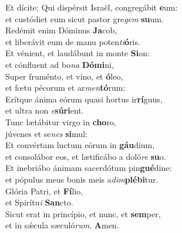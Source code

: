 \evenverse Et dícite: Qui dispérsit Israël, congregábit \textbf{e}um:~\*\\
\evenverse et custódiet eum sicut pastor gre\textit{gem} \textbf{su}um.\\
\oddverse Redémit enim Dóminus \textbf{Ja}cob,~\*\\
\oddverse et liberávit eum de manu poten\textit{ti}\textbf{ó}ris.\\
\evenverse Et vénient, et laudábunt in monte \textbf{Si}on:~\*\\
\evenverse et cónfluent ad bo\textit{na} \textbf{Dó}\textbf{mi}ni,\\
\oddverse Super fruménto, et vino, et \textbf{ó}leo,~\*\\
\oddverse et fœtu pécorum et ar\textit{men}\textbf{tó}rum:\\
\evenverse Erítque ánima eórum quasi hortus ir\textbf{rí}guus,~\*\\
\evenverse et ultra non \textit{e}\textbf{sú}\textbf{ri}ent.\\
\oddverse Tunc lætábitur virgo in \textbf{cho}ro,~\*\\
\oddverse júvenes et se\textit{nes} \textbf{si}mul:\\
\evenverse Et convértam luctum eórum in \textbf{gáu}dium,~\*\\
\evenverse et consolábor eos, et lætificábo a doló\textit{re} \textbf{su}o.\\
\oddverse Et inebriábo ánimam sacerdótum pin\textbf{gué}dine:~\*\\
\oddverse et pópulus meus bonis meis a\textit{dim}\textbf{plé}\textbf{bi}tur.\\
\evenverse Glória Patri, et \textbf{Fí}lio,~\*\\
\evenverse et Spirítu\textit{i} \textbf{San}cto.\\
\oddverse Sicut erat in princípio, et nunc, et \textbf{sem}per,~\*\\
\oddverse et in sǽcula sæculó\textit{rum}. \textbf{A}men.\\

